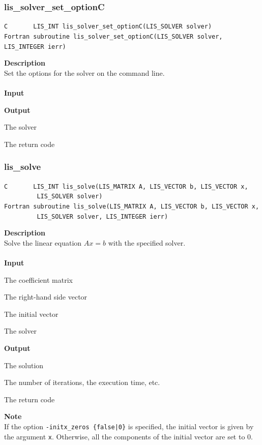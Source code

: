 \documentclass[a4paper]{article}
\newcommand{\namelistlabel}[1]{\mbox{#1}\hfill}
\newenvironment{namelist}[1]{%
\begin{list}{}
  {\let\makelabel\namelistlabel
  \settowidth{\labelwidth}{#1}
  \setlength{\leftmargin}{1.1\labelwidth}}
  }{%
\end{list}}
\begin{document}
\newpage
\subsubsection{lis\_solver\_set\_optionC}
\begin{screen}
\verb|C       LIS_INT lis_solver_set_optionC(LIS_SOLVER solver)|\\
\verb|Fortran subroutine lis_solver_set_optionC(LIS_SOLVER solver, LIS_INTEGER ierr)|
\end{screen}
{\bf Description}\\
\indent
Set the options for the solver on the command line.
\\ \\
\noindent
{\bf Input}
\begin{namelist}{XXXXXXXXXXXXXXXXXXXX}
\item[None]
\end{namelist}
{\bf Output}
\begin{namelist}{XXXXXXXXXXXXXXXXXXXX}
\item[\tt solver] The solver
\item[\tt ierr] The return code
\end{namelist}

\subsubsection{lis\_solve}
\begin{screen}
\verb|C       LIS_INT lis_solve(LIS_MATRIX A, LIS_VECTOR b, LIS_VECTOR x,|\\
\verb|         LIS_SOLVER solver)|\\
\verb|Fortran subroutine lis_solve(LIS_MATRIX A, LIS_VECTOR b, LIS_VECTOR x,|\\
\verb|         LIS_SOLVER solver, LIS_INTEGER ierr)|
\end{screen}
{\bf Description}\\
\indent
Solve the linear equation $Ax = b$ with the specified solver.
\\ \\
\noindent
{\bf Input}
\begin{namelist}{XXXXXXXXXXXXXXXXXXXX}
\item[\tt A] The coefficient matrix
\item[\tt b] The right-hand side vector
\item[\tt x] The initial vector
\item[\tt solver] The solver
\end{namelist}
{\bf Output}
\begin{namelist}{XXXXXXXXXXXXXXXXXXXX}
\item[\tt x] The solution
\item[\tt solver] The number of iterations, the execution time, etc.
\item[\tt ierr] The return code
\end{namelist}
{\bf Note}\\
\indent
If the option {\tt -initx\_zeros \{false|0\}} is specified, the initial
vector is given by the argument {\tt x}.
Otherwise, all the components of the initial vector are set to $0$.
\end{document}
